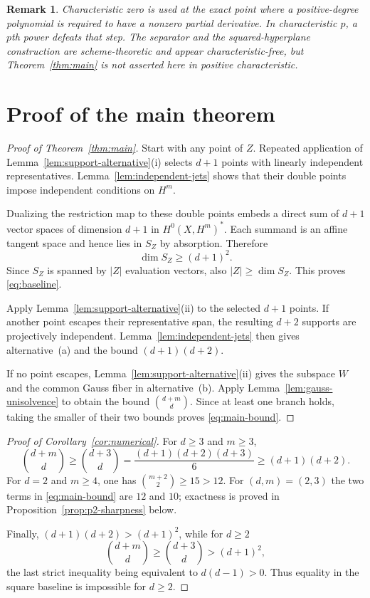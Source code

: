 \documentclass[11pt]{article}
\newtheorem{remark}[theorem]{Remark}
\begin{document}
\begin{remark}\label{rem:characteristic}
Characteristic zero is used at the exact point where a positive-degree
polynomial is required to have a nonzero partial derivative.  In
characteristic $p$, a $p$th power defeats that step.  The separator and the
squared-hyperplane construction are scheme-theoretic and appear
characteristic-free, but Theorem~\ref{thm:main} is not asserted here in
positive characteristic.
\end{remark}

\section{Proof of the main theorem}\label{sec:mainproof}

\begin{proof}[Proof of Theorem~\ref{thm:main}]
Start with any point of $Z$.  Repeated application of
Lemma~\ref{lem:support-alternative}(i) selects $d+1$ points with linearly
independent representatives.  Lemma~\ref{lem:independent-jets} shows that
their double points impose independent conditions on $H^m$.

Dualizing the restriction map to these double points embeds a direct sum of
$d+1$ vector spaces of dimension $d+1$ in $H^0(X,H^m)^*$.  Each summand is
an affine tangent space and hence lies in $S_Z$ by absorption.  Therefore
\[
 \dim S_Z\geq(d+1)^2.
\]
Since $S_Z$ is spanned by $|Z|$ evaluation vectors, also
$|Z|\geq\dim S_Z$.  This proves \eqref{eq:baseline}.

Apply Lemma~\ref{lem:support-alternative}(ii) to the selected $d+1$ points.
If another point escapes their representative span, the resulting $d+2$
supports are projectively independent.  Lemma~\ref{lem:independent-jets}
then gives alternative~(a) and the bound $(d+1)(d+2)$.

If no point escapes, Lemma~\ref{lem:support-alternative}(ii) gives the
subspace $W$ and the common Gauss fiber in alternative~(b).  Apply
Lemma~\ref{lem:gauss-unisolvence} to obtain the bound
$\binom{d+m}{d}$.  Since at least one branch holds, taking the smaller of
their two bounds proves \eqref{eq:main-bound}.
\end{proof}

\begin{proof}[Proof of Corollary~\ref{cor:numerical}]
For $d\geq3$ and $m\geq3$,
\[
 \binom{d+m}{d}\geq\binom{d+3}{d}
 =\frac{(d+1)(d+2)(d+3)}6
 \geq(d+1)(d+2).
\]
For $d=2$ and $m\geq4$, one has
$\binom{m+2}{2}\geq15>12$.  For $(d,m)=(2,3)$ the two terms in
\eqref{eq:main-bound} are $12$ and $10$; exactness is proved in
Proposition~\ref{prop:p2-sharpness} below.

Finally, $(d+1)(d+2)>(d+1)^2$, while for $d\geq2$
\[
 \binom{d+m}{d}\geq\binom{d+3}{d}>(d+1)^2,
\]
the last strict inequality being equivalent to $d(d-1)>0$.  Thus equality
in the square baseline is impossible for $d\geq2$.
\end{proof}
\end{document}
